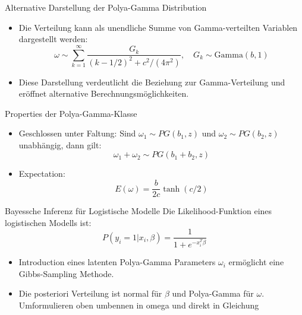 \documentclass{beamer}
\begin{document}
\begin{frame}{Alternative Darstellung der Polya-Gamma Distribution}
	\begin{itemize}
		\item Die Verteilung kann als unendliche Summe von Gamma-verteilten Variablen dargestellt werden:
		\begin{equation}
			\omega \sim \sum_{k=1}^{\infty} \frac{G_k}{(k - 1/2)^2 + c^2/(4  \pi^2)}, \quad G_k \sim \text{Gamma}(b,1)
		\end{equation}
		\item Diese Darstellung verdeutlicht die Beziehung zur Gamma-Verteilung und eröffnet alternative Berechnungsmöglichkeiten.
	\end{itemize}
\end{frame}

	
	\begin{frame}{Properties der Polya-Gamma-Klasse}
		\begin{itemize}
			\item Geschlossen unter Faltung: Sind $\omega_1 \sim PG(b_1, z)$ und $\omega_2 \sim PG(b_2, z)$ unabhängig, dann gilt:
			\begin{equation}
				\omega_1 + \omega_2 \sim PG(b_1 + b_2, z)
			\end{equation}
			\item Expectation:
			\begin{equation}
				E(\omega) = \frac{b}{2c} \tanh(c/2)
			\end{equation}
		\end{itemize}
	\end{frame}
	
	\begin{frame}{Bayessche Inferenz für Logistische Modelle}
		Die Likelihood-Funktion eines logistischen Modells ist:
		\begin{equation}
			P(y_i = 1 | x_i, \beta) = \frac{1}{1 + e^{-x_i^T \beta}}
		\end{equation}
		\begin{itemize}
			\item Introduction eines latenten Polya-Gamma Parameters $\omega_i$ ermöglicht eine Gibbs-Sampling Methode.
			\item Die posteriori Verteilung ist normal für $\beta$ und Polya-Gamma für $\omega$. Umformulieren oben umbennen in omega und direkt in Gleichung
		\end{itemize}
	\end{frame}
	
\end{document}
